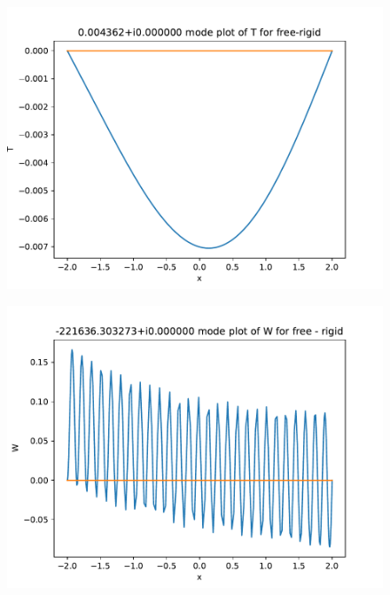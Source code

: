 \documentclass[12pt,a4paper,oneside]{article}
\begin{document}
   \newpage
        \begin{figure}[h!]
          \centering
          \includegraphics{./free-rigid_T_plot.pdf}
        \end{figure}

        \begin{figure}[h!]
          \centering
          \includegraphics{./free-rigid_W_plot.pdf}
        \end{figure}
\end{document}
